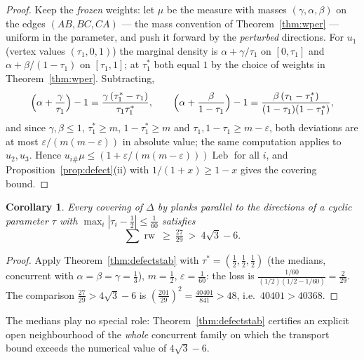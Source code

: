 \documentclass[11pt,reqno]{amsart}
\theoremstyle{plain}
\newtheorem{corollary}[theorem]{Corollary}
\theoremstyle{definition}
\theoremstyle{remark}
\newcommand{\rw}{\operatorname{rw}}
\newcommand{\Leb}{\operatorname{Leb}}
\begin{document}
\begin{proof}
Keep the \emph{frozen} weights: let $\mu$ be the measure with masses
$(\gamma,\alpha,\beta)$ on the edges $(AB,BC,CA)$ --- the mass convention of
Theorem~\ref{thm:wper} --- uniform in the parameter, and
push it forward by the \emph{perturbed} directions. For $u_1$ (vertex values
$(\tau_1,0,1)$) the marginal density is $\alpha+\gamma/\tau_1$ on $[0,\tau_1]$
and $\alpha+\beta/(1-\tau_1)$ on $[\tau_1,1]$; at $\tau_1^*$ both equal $1$ by
the choice of weights in Theorem~\ref{thm:wper}. Subtracting,
\[
\Bigl(\alpha+\frac{\gamma}{\tau_1}\Bigr)-1
=\frac{\gamma\,(\tau_1^*-\tau_1)}{\tau_1\tau_1^*},\qquad
\Bigl(\alpha+\frac{\beta}{1-\tau_1}\Bigr)-1
=\frac{\beta\,(\tau_1-\tau_1^*)}{(1-\tau_1)(1-\tau_1^*)},
\]
and since $\gamma,\beta\le1$, $\tau_1^*\ge m$, $1-\tau_1^*\ge m$ and
$\tau_1,1-\tau_1\ge m-\varepsilon$, both deviations are at most
$\varepsilon/(m(m-\varepsilon))$ in absolute value; the same computation applies
to $u_2,u_3$. Hence $u_{i\#}\mu\le(1+\varepsilon/(m(m-\varepsilon)))\Leb$ for
all $i$, and Proposition~\ref{prop:defect}(ii) with
$1/(1+x)\ge1-x$ gives the covering bound.
\end{proof}

\begin{corollary}\label{cor:beyond}
Every covering of $\Delta$ by planks parallel to the directions of a cyclic
parameter $\tau$ with $\max_i|\tau_i-\tfrac12|\le\tfrac1{60}$ satisfies
\[
\sum\rw\ \ge\ \tfrac{27}{29}\ >\ 4\sqrt3-6 .
\]
\end{corollary}

\begin{proof}
Apply Theorem~\ref{thm:defectstab} with $\tau^*=(\tfrac12,\tfrac12,\tfrac12)$
(the medians, concurrent with $\alpha=\beta=\gamma=\tfrac13$), $m=\tfrac12$,
$\varepsilon=\tfrac1{60}$: the loss is
$\frac{1/60}{(1/2)(1/2-1/60)}=\tfrac2{29}$. The comparison
$\tfrac{27}{29}>4\sqrt3-6$ is $(\tfrac{201}{29})^2=\tfrac{40401}{841}>48$, i.e.\
$40401>40368$.
\end{proof}

The medians play no special role: Theorem~\ref{thm:defectstab} certifies an
explicit open neighbourhood of the \emph{whole} concurrent family on which
the transport bound exceeds the numerical value of $4\sqrt3-6$.
\end{document}
